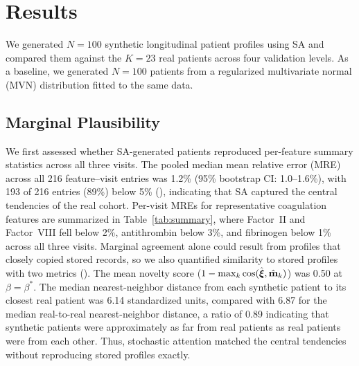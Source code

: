 \section{Results}
\label{sec:results}

We generated $N{=}100$ synthetic longitudinal patient profiles using SA and compared
them against the $K{=}23$ real patients across four validation levels. As a baseline, we generated
$N{=}100$ patients from a regularized multivariate normal (MVN) distribution fitted
to the same data.

\subsection{Marginal Plausibility}
\label{sec:results-l1}

We first assessed whether SA-generated patients reproduced per-feature summary
statistics across all three visits. The pooled median mean relative error
(MRE) across all 216 feature--visit entries was 1.2\% (95\% bootstrap CI:
1.0--1.6\%), with 193 of 216 entries (89\%) below 5\%
(), indicating that SA captured the central
tendencies of the real cohort. Per-visit MREs for representative
coagulation features are summarized in Table~\ref{tab:summary}, where
Factor~II and Factor~VIII fell below 2\%, antithrombin below 3\%, and
fibrinogen below 1\% across all three visits. Marginal agreement alone could result from
profiles that closely copied stored records, so we also quantified similarity to stored
profiles with two metrics (). The mean novelty score
($1 - \max_k \cos(\hat{\boldsymbol{\xi}}, \hat{\mathbf{m}}_k)$) was 0.50 at
$\beta = \beta^*$. The median
nearest-neighbor distance from each synthetic patient to its closest real
patient was 6.14 standardized units, compared with 6.87 for the median
real-to-real nearest-neighbor distance, a ratio of 0.89 indicating that
synthetic patients were approximately as far from real patients as real
patients were from each other. Thus, stochastic attention matched the central tendencies
without reproducing stored profiles exactly.

